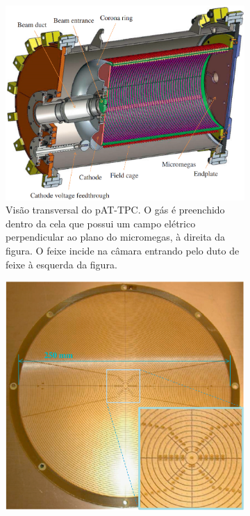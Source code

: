 \documentclass[a4paper,12pt,oneside]{book}
\begin{document}
\begin{figure}[H]
\centering
    \begin{subfigure}[t]{0.49\textwidth}
        \centering
        \includegraphics[scale=0.30]{figs/pattpc.png}
        \caption{Visão transversal do pAT-TPC. O gás é preenchido dentro da cela que possui um campo elétrico perpendicular ao plano do micromegas, à direita da figura. O feixe incide na câmara entrando pelo duto de feixe à esquerda da figura.}
        \label{subfig:pattpc}
    \end{subfigure}%
    \hfill
    \begin{subfigure}[t]{0.49\textwidth}
        \centering
        \includegraphics[scale=0.28]{figs/micromegas.png}

\end{subfigure}
\end{figure}
\end{document}
